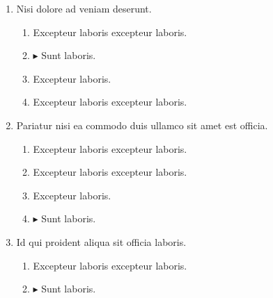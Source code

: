 \documentclass[a4paper,12pt]{article}
\begin{document}
\begin{enumerate}[label=\textbf{\arabic*.}]
\begin{multicols}{2}
\begin{enumerate}
		\item  Excepteur laboris.
    
		\item $\blacktriangleright$  Sunt laboris.
    
	\end{enumerate}

\end{multicols}
\item Nisi dolore ad veniam deserunt.
\begin{multicols}{2}
	\begin{enumerate}
		\item  Excepteur laboris excepteur laboris.
  
		\item $\blacktriangleright$  Sunt laboris.
    
		\item  Excepteur laboris.
    
		\item  Excepteur laboris excepteur laboris.
    
	\end{enumerate}

\end{multicols}
\item Pariatur nisi ea commodo duis ullamco sit amet est officia.
\begin{multicols}{2}
	\begin{enumerate}
		\item  Excepteur laboris excepteur laboris.
    
		\item  Excepteur laboris excepteur laboris.
  
		\item  Excepteur laboris.
    
		\item $\blacktriangleright$  Sunt laboris.
    
	\end{enumerate}

\end{multicols}
\item Id qui proident aliqua sit officia laboris.
\begin{multicols}{2}
	\begin{enumerate}
		\item  Excepteur laboris excepteur laboris.
    
		\item $\blacktriangleright$  Sunt laboris.
    

\end{enumerate}
\end{multicols}
\end{enumerate}
\end{document}
